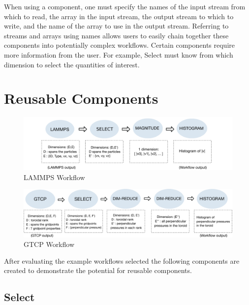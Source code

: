 \documentclass[conference]{IEEEtran}
\begin{document}
When using a component, one must specify the names of the input stream from
which to read, the array in the input stream, the output stream to which to
write, and the name of the array to use in the output stream. Referring to
streams and arrays using names allows users to easily chain together these
components into potentially complex workflows. Certain components require more
information from the user. For example, Select must know from which dimension
to select the quantities of interest.

\section{Reusable Components}
\label{s:reusable-components}

\begin{figure}
\vspace{-0.10in}
  \includegraphics[width=\linewidth]{fig/wflow3}
\vspace{-0.35in}
  \caption{LAMMPS Workflow}
  \label{fig:lammps-workflow}
\vspace{-0.10in}
\end{figure}

\begin{figure}
  \includegraphics[width=\linewidth]{fig/wflow4}
\vspace{-0.25in}
  \caption{GTCP Workflow}
  \label{fig:gtcp-workflow}
\vspace{-0.30in}
\end{figure}

After evaluating the example workflows selected the following components are
created to demonstrate the potential for reusable components.

\subsection{Select}
\end{document}
